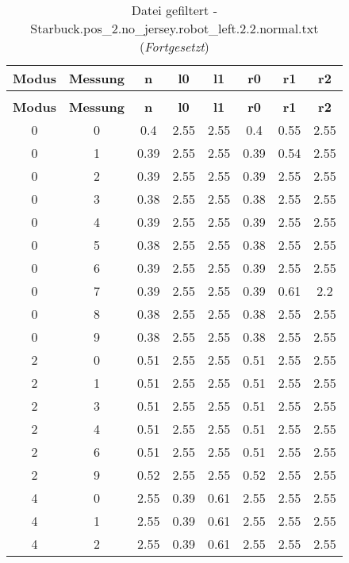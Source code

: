 \begin{longtable}{|c|c||c||c|c||c|c|c|}
	\caption{Datei gefiltert - Starbuck.pos\_2.no\_jersey.robot\_left.2.2.normal.txt} \label{tab:Starbuck.pos-2.no-jersey.robot-left.2.2.normal.txt} \\ \hline
	\textbf{Modus} & \textbf{Messung} & \textbf{n} & \textbf{l0} & \textbf{l1} & \textbf{r0} & \textbf{r1} & \textbf{r2}\\ \hline
	\endfirsthead
	\caption[]{Datei gefiltert - Starbuck.pos\_2.no\_jersey.robot\_left.2.2.normal.txt (\emph{Fortgesetzt})} \\ \hline
	\textbf{Modus} & \textbf{Messung} & \textbf{n} & \textbf{l0} & \textbf{l1} & \textbf{r0} & \textbf{r1} & \textbf{r2}\\ \hline
	\endhead
	0 & 0 & 0.4 & 2.55 & 2.55 & 0.4 & 0.55 & 2.55 \\ \hline
	0 & 1 & 0.39 & 2.55 & 2.55 & 0.39 & 0.54 & 2.55 \\ \hline
	0 & 2 & 0.39 & 2.55 & 2.55 & 0.39 & 2.55 & 2.55 \\ \hline
	0 & 3 & 0.38 & 2.55 & 2.55 & 0.38 & 2.55 & 2.55 \\ \hline
	0 & 4 & 0.39 & 2.55 & 2.55 & 0.39 & 2.55 & 2.55 \\ \hline
	0 & 5 & 0.38 & 2.55 & 2.55 & 0.38 & 2.55 & 2.55 \\ \hline
	0 & 6 & 0.39 & 2.55 & 2.55 & 0.39 & 2.55 & 2.55 \\ \hline
	0 & 7 & 0.39 & 2.55 & 2.55 & 0.39 & 0.61 & 2.2 \\ \hline
	0 & 8 & 0.38 & 2.55 & 2.55 & 0.38 & 2.55 & 2.55 \\ \hline
	0 & 9 & 0.38 & 2.55 & 2.55 & 0.38 & 2.55 & 2.55 \\ \hline
	2 & 0 & 0.51 & 2.55 & 2.55 & 0.51 & 2.55 & 2.55 \\ \hline
	2 & 1 & 0.51 & 2.55 & 2.55 & 0.51 & 2.55 & 2.55 \\ \hline
	2 & 3 & 0.51 & 2.55 & 2.55 & 0.51 & 2.55 & 2.55 \\ \hline
	2 & 4 & 0.51 & 2.55 & 2.55 & 0.51 & 2.55 & 2.55 \\ \hline
	2 & 6 & 0.51 & 2.55 & 2.55 & 0.51 & 2.55 & 2.55 \\ \hline
	2 & 9 & 0.52 & 2.55 & 2.55 & 0.52 & 2.55 & 2.55 \\ \hline
	4 & 0 & 2.55 & 0.39 & 0.61 & 2.55 & 2.55 & 2.55 \\ \hline
	4 & 1 & 2.55 & 0.39 & 0.61 & 2.55 & 2.55 & 2.55 \\ \hline
	4 & 2 & 2.55 & 0.39 & 0.61 & 2.55 & 2.55 & 2.55 \\ \hline

\end{longtable}
